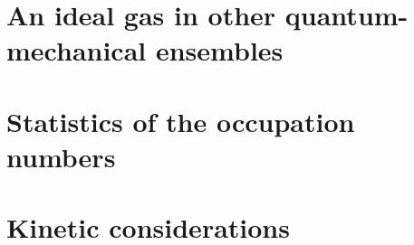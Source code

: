 \documentclass[12pt,a4paper]{article}
\begin{document}
\section{An ideal gas in other quantum-mechanical ensembles}




\section{Statistics of the occupation numbers}



\section{Kinetic considerations}
\end{document}
